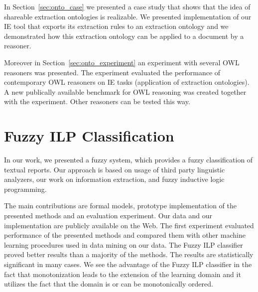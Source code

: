 In Section~\ref{sec:onto_case} we presented a case study that shows that the idea of shareable extraction ontologies is realizable. We presented implementation of our IE tool that exports its extraction rules to an extraction ontology and we demonstrated how this extraction ontology can be applied to a document by a reasoner.

Moreover in Section~\ref{sec:onto_experiment} an experiment with several OWL reasoners was presented. The experiment evaluated the performance of contemporary OWL reasoners on IE tasks (application of extraction ontologies). A new publically available benchmark for OWL reasoning was created together with the experiment. Other reasoners can be tested this way.




\section{Fuzzy ILP Classification} \label{sec:conclusion}


In our work, we presented a fuzzy system, which provides a fuzzy classification of textual reports. Our approach is based on usage of third party linguistic analyzers, our work on information extraction, and fuzzy inductive logic programming.

The main contributions are formal models, prototype implementation of the presented methods and an evaluation experiment. Our data and our implementation are publicly available on the Web. The first experiment evaluated performance of the presented methods and compared them with other machine learning procedures used in data mining on our data. The Fuzzy ILP classifier proved better results than a majority of the methods. The results are statistically significant in many cases. 
We see the advantage of the Fuzzy ILP classifier in the fact that monotonization leads to the extension of the learning domain and it utilizes the fact that the domain is or can be monotonically ordered.

